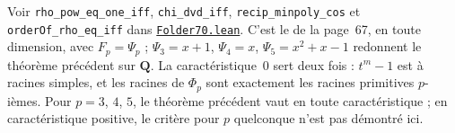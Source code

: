 \begin{remarque}
Voir \texttt{rho\_pow\_eq\_one\_iff}, \texttt{chi\_dvd\_iff}, \texttt{recip\_minpoly\_cos} et \texttt{orderOf\_rho\_eq\_iff} dans \href{\leanblob/Geometry/Folder70.lean}{\texttt{Folder70.\allowbreak{}lean}}. C'est le  de la page~67, en toute dimension, avec $F_p = \Psi_p$ ; $\Psi_3 = x + 1$, $\Psi_4 = x$, $\Psi_5 = x^2 + x - 1$ redonnent le théorème précédent sur $\mathbf Q$. La caractéristique~$0$ sert deux fois : $t^m - 1$ est à racines simples, et les racines de $\Phi_p$ sont exactement les racines primitives $p$-ièmes. Pour $p = 3$, $4$, $5$, le théorème précédent vaut en toute caractéristique ; en caractéristique positive, le critère pour $p$ quelconque n'est pas démontré ici.
\end{remarque}
